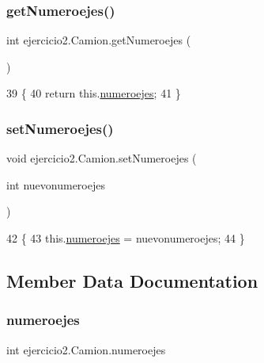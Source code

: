 \subsubsection{\texorpdfstring{get\+Numeroejes()}{getNumeroejes()}}
{\footnotesize\ttfamily int ejercicio2.\+Camion.\+get\+Numeroejes (\begin{DoxyParamCaption}{ }\end{DoxyParamCaption})\hspace{0.3cm}{\ttfamily [inline]}}


\begin{DoxyCode}
39                               \{
40         \textcolor{keywordflow}{return} this.\mbox{\hyperlink{classejercicio2_1_1_camion_a212debf109984d9e6d453a0370bbad13}{numeroejes}};
41     \}
\end{DoxyCode}
\mbox{\label{classejercicio2_1_1_camion_a5ebe5eaea3ed9c68de9cffe88c2f05b2}} 
\subsubsection{\texorpdfstring{set\+Numeroejes()}{setNumeroejes()}}
{\footnotesize\ttfamily void ejercicio2.\+Camion.\+set\+Numeroejes (\begin{DoxyParamCaption}\item[{int}]{nuevonumeroejes }\end{DoxyParamCaption})\hspace{0.3cm}{\ttfamily [inline]}}


\begin{DoxyCode}
42                                                   \{
43         this.\mbox{\hyperlink{classejercicio2_1_1_camion_a212debf109984d9e6d453a0370bbad13}{numeroejes}} = nuevonumeroejes;
44     \}
\end{DoxyCode}


\subsection{Member Data Documentation}
\mbox{\label{classejercicio2_1_1_camion_a212debf109984d9e6d453a0370bbad13}} 
\subsubsection{\texorpdfstring{numeroejes}{numeroejes}}
{\footnotesize\ttfamily int ejercicio2.\+Camion.\+numeroejes\hspace{0.3cm}{\ttfamily [private]}}

